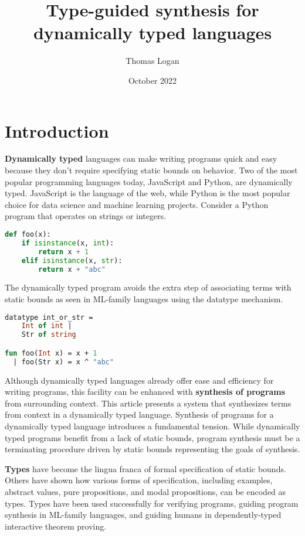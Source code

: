 \documentclass[sigplan,screen]{acmart}
\title{Type-guided synthesis for dynamically typed languages}
\author{Thomas Logan}
\date{October 2022}
\begin{document}
\maketitle
\section{Introduction}


\textbf{Dynamically typed} languages can make writing programs quick and easy 
because they don't require specifying static bounds on behavior.
Two of the most popular programming languages today, JavaScript and Python, 
are dynamically typed. 
JavaScript is the language of the web, while Python is the most popular choice
for data science and machine learning projects. 
Consider a Python program that operates on strings or integers. 

\begin{lstlisting}[language=Python]
def foo(x):
    if isinstance(x, int):
        return x + 1 
    elif isinstance(x, str): 
        return x + "abc"
\end{lstlisting}

\noindent The dynamically typed program avoids the extra step of associating terms with
static bounds as seen in ML-family languages using the datatype mechanism. 

\begin{lstlisting}[language=ML]
datatype int_or_str = 
    Int of int | 
    Str of string

fun foo(Int x) = x + 1
  | foo(Str x) = x ^ "abc"
\end{lstlisting}


Although dynamically typed languages already offer ease and efficiency for writing programs, 
this facility can be enhanced with \textbf{synthesis of programs} 
from surrounding context. 
This article presents a system that synthesizes terms from context 
in a dynamically typed language.
Synthesis of programs for a dynamically typed language introduces a fundamental tension. 
While dynamically typed programs benefit from a lack of static bounds, program synthesis
must be a terminating procedure driven by static bounds representing the goals of synthesis.   

\textbf{Types} have become the lingua franca of formal specification of static bounds.
Others have shown how various forms of specification, including examples, abstract values, 
pure propositions, and modal propositions, can be encoded as types.
Types have been used successfully for verifying programs, 
guiding program synthesis in ML-family languages, 
and guiding humans in dependently-typed interactive theorem proving. 
\end{document}
